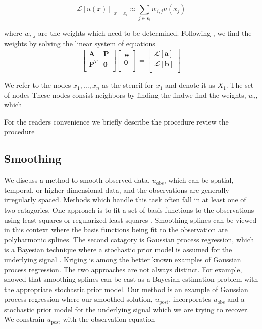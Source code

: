 \documentclass[10pt,a4paper]{article}
\begin{document}
\begin{equation}\label{eq.RBFFDApprox}
\mathcal{L}[u(x)]\big|_{x=x_i} \approx \sum_{j \in \mathbf{s}_i} w_{i,j} u(x_j)
\end{equation}
 
where $w_{i,j}$ are the weights which need to be determined. Following \citet{Fornberg2015}, we find the weights by solving the linear system of equations
\begin{equation}\label{eq:RBFFDWeights}
\left[
      \begin{array}{cc}
      \mathbf{A} & \mathbf{P} \\
      \mathbf{P}^{T} & \mathbf{0} \\
      \end{array}
\right]
\left[
  \begin{array}{c}
  \mathbf{w} \\
  \mathbf{0} \\
  \end{array}
\right]  
=
\left[
  \begin{array}{c}
  \mathcal{L}[\mathbf{a}] \\
  \mathcal{L}[\mathbf{b}] \\
  \end{array}
\right]
\end{equation}


We refer to the nodes $x_1, \dots, x_n$ as the stencil for $x_1$ and denote it as $X_1$.  The set of nodes   These nodes consist     neighbors by finding the  findwe find the weights, $w_i$, which 


For the readers convenience we briefly describe the procedure review the procedure 

\subsection{Smoothing}
We discuss a method to smooth observed data, $u_\mathrm{obs}$, which can be spatial, temporal, or higher dimensional data, and the observations are generally irregularly spaced.  Methods which handle this task often fall in at least one of two catagories.  One approach is to fit a set of basis functions to the observations using least-squares or regularized least-squares \citep[e.g.][]{Fasshauer2007}.  Smoothing splines can be viewed in this context where the basis functions being fit to the observation are polyharmonic splines.  The second catagory is Gaussian process regression, which is a Bayesian technique where a stochastic prior model is assumed for the underlying signal \citep[e.g.][]{Rasmussen2006}.  Kriging is among the better known examples of Gaussian process regression.  The two approaches are not always distinct.  For example, \citet{Kimeldorf1970} showed that smoothing splines can be cast as a Bayesian estimation problem with the appropriate stochastic prior model.  Our method is an example of Gaussian process regression where our smoothed solution, $u_\mathrm{post}$, incorporates $u_\mathrm{obs}$ and a stochastic prior model for the underlying signal which we are trying to recover.  We constrain $u_\mathrm{post}$ with the observation equation
\end{document}
